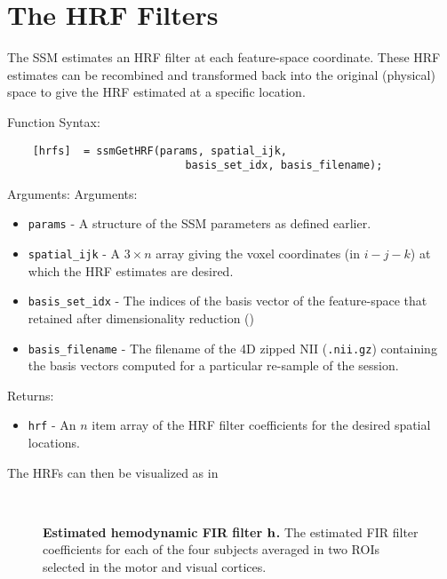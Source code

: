 \section{The HRF Filters}
The SSM estimates an HRF filter at each feature-space coordinate.
These HRF estimates can be recombined and transformed back into the
original (physical) space to give the HRF estimated at a specific
location.

Function Syntax:
\begin{verbatim}
    [hrfs]  = ssmGetHRF(params, spatial_ijk,
                            basis_set_idx, basis_filename);
\end{verbatim}
Arguments: Arguments:
\begin{itemize}
     \item \verb"params" - A structure of the SSM parameters as
      defined earlier.
  \item \verb"spatial_ijk" - A $3\times n$ array giving the voxel
  coordinates (in $i-j-k$) at which the HRF estimates are desired.
    \item \verb"basis_set_idx" -
   The indices of the basis vector of the feature-space that
   retained after dimensionality reduction (\cf {})
  \item \verb"basis_filename" -
    The filename of the 4D zipped NII (\verb".nii.gz")
    containing the basis vectors computed for a particular re-sample of the
    session.
\end{itemize}
Returns:
\begin{itemize}
    \item \verb"hrf" - An $n$ item array of the HRF filter
    coefficients for the desired spatial locations.
\end{itemize}

The HRFs can then be visualized as in 


\begin{figure}[h!]
     \centering
 \mbox{
}
    \caption[Estimated Hemodynamic Response]
    {\footnotesize \textbf{Estimated hemodynamic FIR filter ${\mathbf{h}}$.}
    The estimated FIR filter coefficients for each of the four
    subjects averaged in two ROIs selected in the motor and visual cortices.
    \label{fig:hrf-estimate}
    }
\end{figure}
